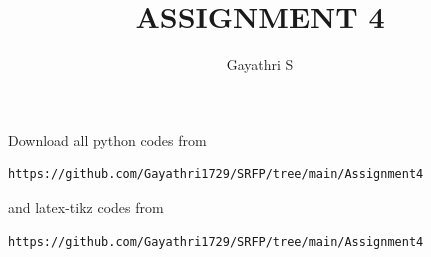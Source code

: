 \documentclass[journal,12pt,twocolumn]{IEEEtran}
\begin{document}
%


\newtheorem{theorem}{Theorem}[section]
\newtheorem{problem}{Problem}
\newtheorem{proposition}{Proposition}[section]
\newtheorem{lemma}{Lemma}[section]
\newtheorem{corollary}[theorem]{Corollary}
\newtheorem{example}{Example}[section]
\newtheorem{definition}[problem]{Definition}
\newcommand{\BEQA}{\begin{eqnarray}}
\newcommand{\EEQA}{\end{eqnarray}}
\newcommand{\define}{\stackrel{\triangle}{=}}

\providecommand{\mbf}{\mathbf}
\providecommand{\pr}[1]{\ensuremath{\Pr\left(#1\right)}}
\providecommand{\qfunc}[1]{\ensuremath{Q\left(#1\right)}}
\providecommand{\sbrak}[1]{\ensuremath{{}\left[#1\right]}}
\providecommand{\lsbrak}[1]{\ensuremath{{}\left[#1\right.}}
\providecommand{\rsbrak}[1]{\ensuremath{{}\left.#1\right]}}
\providecommand{\brak}[1]{\ensuremath{\left(#1\right)}}
\providecommand{\lbrak}[1]{\ensuremath{\left(#1\right.}}
\providecommand{\rbrak}[1]{\ensuremath{\left.#1\right)}}
\providecommand{\cbrak}[1]{\ensuremath{\left\{#1\right\}}}
\providecommand{\lcbrak}[1]{\ensuremath{\left\{#1\right.}}
\providecommand{\rcbrak}[1]{\ensuremath{\left.#1\right\}}}
\theoremstyle{remark}
\newtheorem{rem}{Remark}
\newcommand{\sgn}{\mathop{\mathrm{sgn}}}
\providecommand{\abs}[1]{\left\vert#1\right\vert}
\providecommand{\res}[1]{\Res\displaylimits_{#1}} 
\providecommand{\norm}[1]{\left\lVert#1\right\rVert}
\providecommand{\mtx}[1]{\mathbf{#1}}
\providecommand{\mean}[1]{E\left[ #1 \right]}
\providecommand{\fourier}{\overset{\mathcal{F}}{ \rightleftharpoons}}
\providecommand{\system}{\overset{\mathcal{H}}{ \longleftrightarrow}}


\newcommand{\myvec}[1]{\ensuremath{\begin{pmatrix}#1\end{pmatrix}}}
\newcommand{\cmyvec}[1]{\ensuremath{\begin{pmatrix*}[c]#1\end{pmatrix*}}}
\newcommand{\mydet}[1]{\ensuremath{\begin{vmatrix}#1\end{vmatrix}}}
\newcommand{\proj}[2]{\textbf{proj}_{\vec{#1}}\vec{#2}}
\let\StandardTheFigure\thefigure
\let\vec\mathbf
\title{
ASSIGNMENT 4
}
\author{Gayathri S}
	

\maketitle
\renewcommand{\thefigure}{\theenumi}
\renewcommand{\thetable}{\theenumi}
  Download all python codes from 
\begin{lstlisting}
https://github.com/Gayathri1729/SRFP/tree/main/Assignment4
\end{lstlisting}
%
and latex-tikz codes from 
%
\begin{lstlisting}
https://github.com/Gayathri1729/SRFP/tree/main/Assignment4
\end{lstlisting}
%
\end{document}
